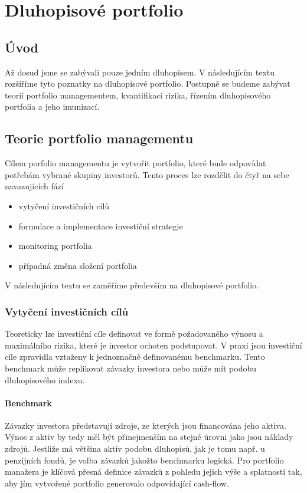 \documentclass[a4paper]{book}
\begin{document}
\chapter{Dluhopisové portfolio}

\section{Úvod}

Až dosud jsme se zabývali pouze jedním dluhopisem. V následujícím textu rozšíříme tyto poznatky na dluhopisové portfolio. Postupně se budeme zabývat teorií portfolio managementem, kvantifikací rizika, řízením dluhopisového portfolia a jeho imunizací.

\section{Teorie portfolio managementu}

Cílem porfolio managementu je vytvořit portfolio, které bude odpovídat potřebám vybrané skupiny investorů. Tento proces lze rozdělit do čtyř na sebe navazujících fází
\begin{itemize}
\item vytyčení investičních cílů
\item formulace a implementace investiční strategie
\item monitoring portfolia
\item případná změna složení portfolia
\end{itemize}
V následujícím textu se zaměříme především na dluhopisové portfolio.

\subsection{Vytyčení investičních cílů}

Teoreticky lze investiční cíle definovat ve formě požadovaného výnosu a maximálního rizika, které je investor ochoten podstupovat. V praxi jsou investiční cíle zpravidla vztaženy k jednoznačně definovanému benchmarku. Tento benchmark může replikovat závazky investora nebo může mít podobu dluhopisového indexu.

\subsubsection{Benchmark}

Závazky investora představují zdroje, ze kterých jsou financována jeho aktiva. Výnos z aktiv by tedy měl být přinejmenším na stejné úrovni jako jsou náklady zdrojů. Jestliže má většina aktiv podobu dluhopisů, jak je tomu např. u penzijních fondů, je volba závazků jakožto benchmarku logická. Pro portfolio manažera je klíčová přesná definice závazků z pohledu jejich výše a splatnosti tak, aby jím vytvořené portfolio generovalo odpovídající cash-flow.
\end{document}

